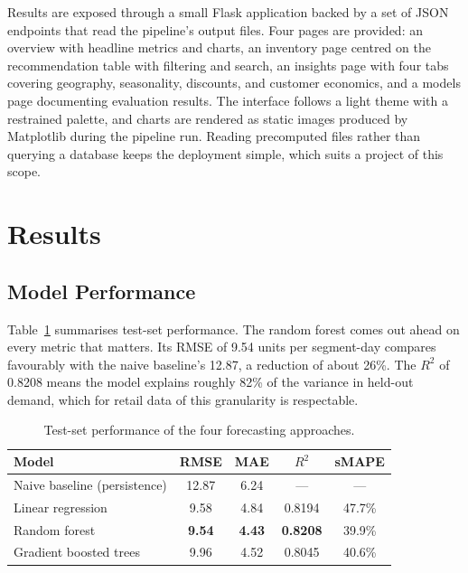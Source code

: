 \documentclass[11pt,a4paper]{article}
\begin{document}
Results are exposed through a small Flask application backed by a set of JSON endpoints that read the pipeline's output files. Four pages are provided: an overview with headline metrics and charts, an inventory page centred on the recommendation table with filtering and search, an insights page with four tabs covering geography, seasonality, discounts, and customer economics, and a models page documenting evaluation results. The interface follows a light theme with a restrained palette, and charts are rendered as static images produced by Matplotlib during the pipeline run. Reading precomputed files rather than querying a database keeps the deployment simple, which suits a project of this scope.

\section{Results}\label{sec:results}

\subsection{Model Performance}

Table~\ref{tab:models} summarises test-set performance. The random forest comes out ahead on every metric that matters. Its RMSE of 9.54 units per segment-day compares favourably with the naive baseline's 12.87, a reduction of about 26\%. The $R^2$ of 0.8208 means the model explains roughly 82\% of the variance in held-out demand, which for retail data of this granularity is respectable.

\begin{table}[h]
\centering
\caption{Test-set performance of the four forecasting approaches.}
\label{tab:models}
\begin{tabular}{lcccc}
\toprule
Model & RMSE & MAE & $R^2$ & sMAPE \\
\midrule
Naive baseline (persistence) & 12.87 & 6.24 & --- & --- \\
Linear regression & 9.58 & 4.84 & 0.8194 & 47.7\% \\
Random forest & \textbf{9.54} & \textbf{4.43} & \textbf{0.8208} & 39.9\% \\
Gradient boosted trees & 9.96 & 4.52 & 0.8045 & 40.6\% \\
\bottomrule
\end{tabular}
\end{table}
\end{document}
